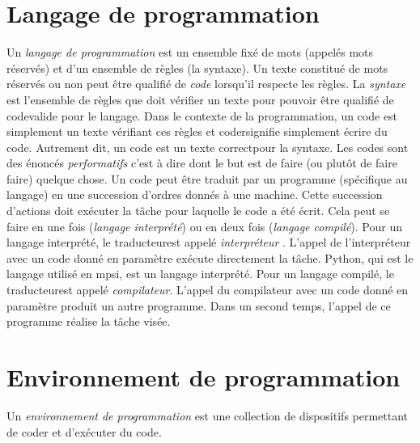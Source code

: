 
\usepackage{parcolumns}
\setlength{\parindent}{0pt}
\makeindex




\section{Langage de programmation}
Un \emph{langage de programmation}  est un ensemble fixé de mots (appelés mots \og réservés\fg) et d'un ensemble de règles (la syntaxe). Un texte constitué de mots réservés  ou non peut être qualifié de \emph{code}  lorsqu'il respecte les règles.\newline
La \emph{syntaxe} est l'ensemble de règles que doit vérifier un texte pour pouvoir être qualifié de \og code\fg valide pour le langage. Dans le contexte de la programmation, un code est simplement un texte vérifiant ces règles et \og coder\fg signifie simplement écrire du code. Autrement dit, un code est un texte \og correct\fg pour la syntaxe.\newline
Les codes sont des énoncés \emph{performatifs}  c'est à dire dont le but est de faire (ou plutôt de faire faire) quelque chose. 
Un code peut être traduit par un programme (spécifique au langage) en une succession d'ordres donnés à une machine. Cette succession d'actions doit exécuter la tâche pour laquelle le code a été écrit. Cela peut se faire en une fois (\emph{langage interprété}) ou en deux fois (\emph{langage compilé}).  \newline
Pour un langage interprété, le \og traducteur\fg est appelé \emph{interpréteur} . L'appel de l'interpréteur avec un code donné en paramètre exécute directement la tâche. Python, qui est le langage utilisé en mpsi, est un langage interprété.\newline
Pour un langage compilé, le \og traducteur\fg est appelé \emph{compilateur}.  L'appel du compilateur avec un code donné en paramètre produit un autre programme. Dans un second temps, l'appel de ce programme réalise la tâche visée.\newline

\section{Environnement de programmation}
Un \emph{environnement de programmation}  est une collection de dispositifs permettant de coder et d'exécuter du code.
